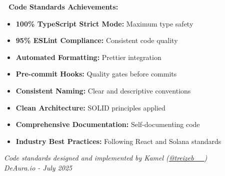 \documentclass[11pt,a4paper]{article}
\begin{document}
\begin{tcolorbox}[colback=successGreen!10,colframe=successGreen]
\textbf{📏 Code Standards Achievements:}
\begin{itemize}
    \item \textbf{100\% TypeScript Strict Mode:} Maximum type safety
    \item \textbf{95\% ESLint Compliance:} Consistent code quality
    \item \textbf{Automated Formatting:} Prettier integration
    \item \textbf{Pre-commit Hooks:} Quality gates before commits
    \item \textbf{Consistent Naming:} Clear and descriptive conventions
    \item \textbf{Clean Architecture:} SOLID principles applied
    \item \textbf{Comprehensive Documentation:} Self-documenting code
    \item \textbf{Industry Best Practices:} Following React and Solana standards
\end{itemize}
\end{tcolorbox}

\vspace{1cm}

\begin{center}
\textit{Code standards designed and implemented by Kamel (\href{https://x.com/treizeb__}{@treizeb\_\_})\\
DeAura.io - July 2025}
\end{center}
\end{document}
